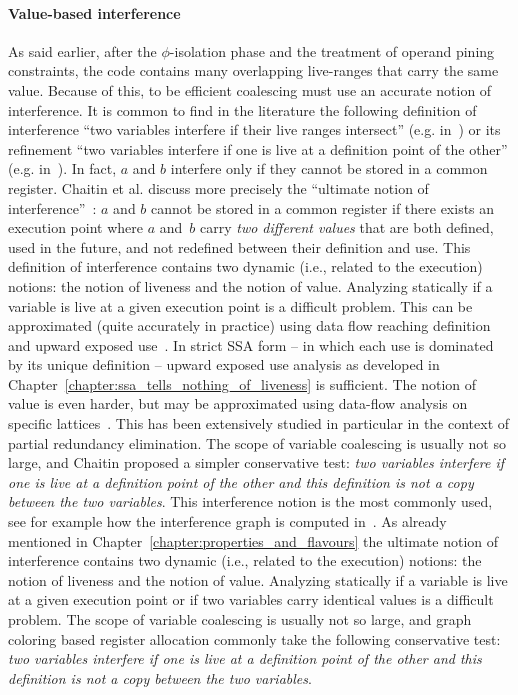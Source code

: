 \paragraph{Value-based interference}
\label{par:alternative_ssa_destruction:value}
As said earlier, after the $\phi$-isolation phase and the treatment of operand pining constraints, the code contains many overlapping live-ranges that carry the same value. Because of this, to be efficient coalescing must use an accurate notion of interference.
\ifhab
It is common to find in the literature the following definition of
  interference ``two variables interfere if their live ranges intersect''
  (e.g.  in~\cite{George96,liverange.pldi02,SmithRH04}) or its refinement ``two variables interfere if one is live at a definition point of the other'' (e.g. in~\cite{Chaitin82}).  In fact, $a$ and $b$ interfere only if
they cannot be stored in a common register. 
Chaitin et al.  discuss more
  precisely the ``ultimate notion of interference''~\cite{Chaitin81}:
$a$ and $b$
cannot be stored in a common register if there exists an execution point where
$a$ and~$b$ carry {\em two different values} that are both defined, used in the
future, and not redefined between their definition and use.  
%
This definition of interference contains two dynamic (i.e., related to the
execution) notions: the notion of liveness and the notion of value.  
Analyzing statically if a variable is live at a given execution point is a difficult problem. 
This can be approximated (quite accurately in practice) using data
flow reaching definition and upward exposed use~\cite{appel:2002:modern}.  In
strict SSA form -- in which each use is dominated by its unique
definition -- upward exposed use analysis as developed in Chapter~\ref{chapter:ssa_tells_nothing_of_liveness} is sufficient.  The
notion of value is even harder, but may be approximated using data-flow
analysis on specific lattices~\cite{AlpernWZ88, BouchezDEA}.  This has been
extensively studied in particular in the context of partial redundancy
elimination.
The scope of variable coalescing is usually not so large, and
Chaitin proposed a simpler conservative test: \emph{two variables interfere if
  one is live at a definition point of the other and this definition is not a
  copy between the two variables}. This interference notion is the most
commonly used, see for example how the interference graph is computed
in~\cite{appel:2002:modern}.
\else
As already mentioned in Chapter~\ref{chapter:properties_and_flavours} the ultimate notion of interference contains two dynamic (i.e., related to the
execution) notions: the notion of liveness and the notion of value.  
Analyzing statically if a variable is live at a given execution point or if two variables carry identical values is a difficult problem.
The scope of variable coalescing is usually not so large, and graph coloring based register allocation commonly take the following conservative test: \emph{two variables interfere if one is live at a definition point of the other and this definition is not a copy between the two variables}.
\fi

